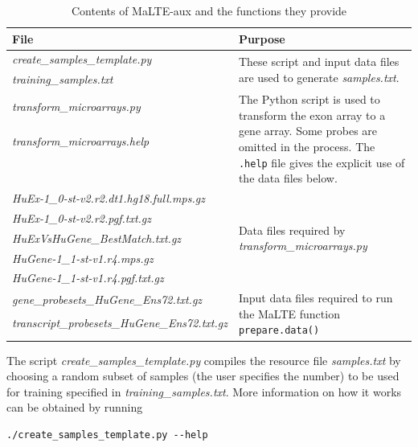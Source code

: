 \documentclass[a4paper,12pt]{article}
\begin{document}
\begin{table}
\centering
\begin{tabular}{|l|p{6cm}|}
\hline
\textbf{File} & \textbf{Purpose} \\
\hline
\textit{create\_samples\_template.py} & \multirow{2}{*}{\parbox{6cm}{These script and input data files are used to generate \textit{samples.txt}.}} \\
\textit{training\_samples.txt} & \\
\hline
\textit{transform\_microarrays.py} & \multirow{6}{*}{\parbox{6cm}{The \textsf{Python} script is used to transform the exon array to a gene array. Some probes are omitted in the process. The \texttt{.help} file gives the explicit use of the data files below.}} \\
\textit{transform\_microarrays.help} & \\
 & \\
 & \\
 & \\
 & \\
\hline

\textit{HuEx-1\_0-st-v2.r2.dt1.hg18.full.mps.gz} & \multirow{5}{*}{\parbox{6cm}{Data files required by \textit{transform\_microarrays.py}}} \\
\textit{HuEx-1\_0-st-v2.r2.pgf.txt.gz} & \\
\textit{HuExVsHuGene\_BestMatch.txt.gz} & \\
\textit{HuGene-1\_1-st-v1.r4.mps.gz} & \\
\textit{HuGene-1\_1-st-v1.r4.pgf.txt.gz} & \\
\hline
\textit{gene\_probesets\_HuGene\_Ens72.txt.gz} & \multirow{3}{*}{\parbox{6cm}{Input data files required to run the \textsf{MaLTE} function \texttt{prepare.data()}}} \\ \textit{transcript\_probesets\_HuGene\_Ens72.txt.gz} & \\
 & \\
\hline
\end{tabular}
\caption{Contents of \textsf{MaLTE-aux} and the functions they provide}
\label{tab:malte_aux}
\end{table}

The script \textit{create\_samples\_template.py} compiles the resource file \textit{samples.txt} by choosing a random subset of samples (the user specifies the number) to be used for training specified in \textit{training\_samples.txt}. More information on how it works can be obtained by running 

\begin{verbatim}
./create_samples_template.py --help
\end{verbatim}
\end{document}
